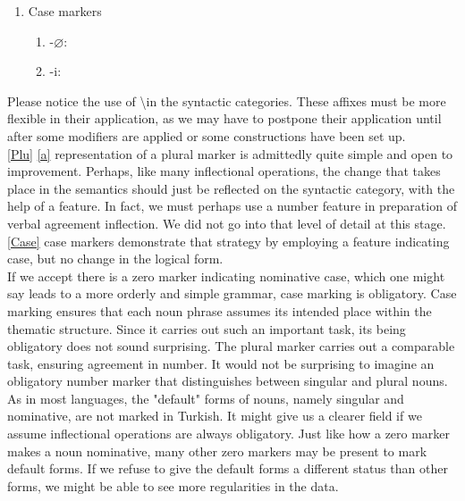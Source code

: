 \documentclass[11pt]{article} %
\begin{document}
\begin{enumerate}[resume*]
	\item Case markers \label{Case}
	\begin{enumerate}[label=(\alph*), ref=(\alph*)]\itemsep1pt
	\item -$\varnothing$: 
	\item -i: 
	\end{enumerate}
\end{enumerate}

Please notice the use of \textbackslash in the syntactic categories. These affixes must be more flexible in their application, as we may have to postpone their application until after some modifiers are applied or some constructions have been set up. \\

\ref{Plu} \ref{a} representation of a plural marker is admittedly quite simple and open to improvement. Perhaps, like many inflectional operations, the change that takes place in the semantics should just be reflected on the syntactic category, with the help of a feature. In fact, we must perhaps use a number feature in preparation of verbal agreement inflection. We did not go into that level of detail at this stage. \ref{Case} case markers demonstrate that strategy by employing a feature indicating case, but no change in the logical form. \\

If we accept there is a zero marker indicating nominative case, which one might say leads to a more orderly and simple grammar, case marking is obligatory. Case marking ensures that each noun phrase assumes its intended place within the thematic structure. Since it carries out such an important task, its being obligatory does not sound surprising. The plural marker carries out a comparable task, ensuring agreement in number. It would not be surprising to imagine an obligatory number marker that distinguishes between singular and plural nouns. As in most languages, the "default" forms of nouns, namely singular and nominative, are not marked in Turkish. It might give us a clearer field if we assume inflectional operations are always obligatory. Just like how a zero marker makes a noun nominative, many other zero markers may be present to mark default forms. If we refuse to give the default forms a different status than other forms, we might be able to see more regularities in the data. \\
\end{document}

